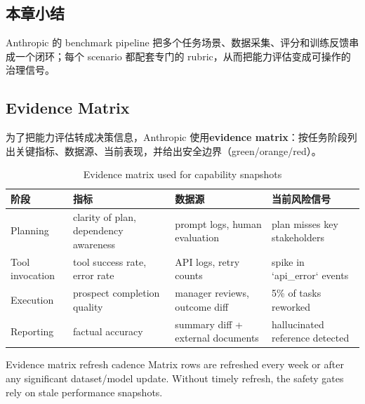 \subsection{本章小结}

Anthropic 的 benchmark pipeline 把多个任务场景、数据采集、评分和训练反馈串成一个闭环；每个 scenario 都配套专门的 rubric，从而把能力评估变成可操作的治理信号。

\subsection{Evidence Matrix}

为了把能力评估转成决策信息，Anthropic 使用\textbf{evidence matrix}：按任务阶段列出关键指标、数据源、当前表现，并给出安全边界（green/orange/red）。

\begin{table}[H]
\centering
\begin{tabular}{p{}p{}p{}p{}}
\toprule
阶段 & 指标 & 数据源 & 当前风险信号 \\
\midrule
Planning & clarity of plan, dependency awareness & prompt logs, human evaluation & plan misses key stakeholders \\
Tool invocation & tool success rate, error rate & API logs, retry counts & spike in `api\_error` events \\
Execution & prospect completion quality & manager reviews, outcome diff & 5\% of tasks reworked \\
Reporting & factual accuracy & summary diff + external documents & hallucinated reference detected \\
\bottomrule
\end{tabular}
\caption{Evidence matrix used for capability snapshots}
\end{table}

\begin{warningbox}{Evidence matrix refresh cadence}
Matrix rows are refreshed every week or after any significant dataset/model update. Without timely refresh, the safety gates rely on stale performance snapshots.
\end{warningbox}

